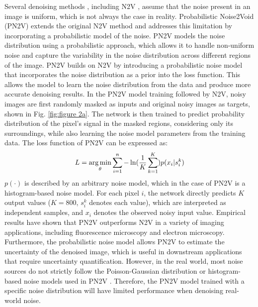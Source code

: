 \documentclass[conference]{IEEEtran}
\begin{document}
Several denoising methods \cite{lehtinen2018noise2noise, krull2019noise2void, laine2019high}, including N2V \cite{krull2019noise2void}, assume that the noise present in an image is uniform, which is not always the case in reality. Probabilistic Noise2Void (PN2V) \cite{krull2020probabilistic} extends the original N2V method and addresses this limitation by incorporating a probabilistic model of the noise. PN2V models the noise distribution using a probabilistic approach, which allows it to handle non-uniform noise and capture the variability in the noise distribution across different regions of the image. PN2V builds on N2V by introducing a probabilistic noise model that incorporates the noise distribution as a prior into the loss function. This allows the model to learn the noise distribution from the data and produce more accurate denoising results. 
In the PN2V model training followed by N2V, noisy images are first randomly masked as inputs and original noisy images as targets, shown in Fig. \ref{fig:figure 2a}. The network is then trained to predict probability distribution of the pixel’s signal in the masked regions, considering only its surroundings, while also learning the noise model parameters from the training data. The loss function of PN2V can be expressed as:
\begin{equation}
	\setlength{\abovedisplayskip}{0pt}
	\setlength{\belowdisplayskip}{0pt}
	L = \mathop{\arg\min}\limits_\theta \sum\limits_{i=1}^n {- \ln(\frac{1}{K} \sum\limits_{k=1}^K) {p(x_i|s_{i}^{k})}}
	\label{eq:PN2V}
\end{equation}
$p(\cdot)$ is described by an arbitrary noise model, which in the case of PN2V \cite{krull2020probabilistic} is a histogram-based noise model. For each pixel $i$, the network directly predicts $K$ output values ($K=800$, $s_i^k$ denotes each value), which are interpreted as independent samples, and $x_i$ denotes the observed noisy input value. 
Empirical results have shown that PN2V \cite{krull2020probabilistic} outperforms N2V \cite{krull2019noise2void} in a variety of imaging applications, including fluorescence microscopy and electron microscopy. Furthermore, the probabilistic noise model allows PN2V to estimate the uncertainty of the denoised image, which is useful in downstream applications that require uncertainty quantification. 
However, in the real world, most noise sources do not strictly follow the Poisson-Gaussian distribution or histogram-based noise models used in PN2V \cite{krull2020probabilistic}. Therefore, the PN2V model trained with a specific noise distribution will have limited performance when denoising real-world noise.
\end{document}
